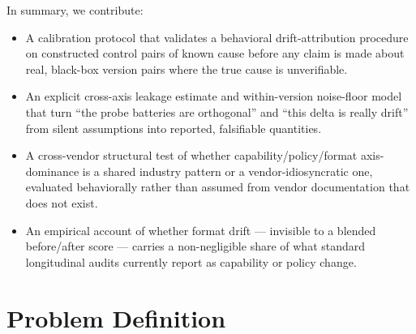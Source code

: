 \documentclass[11pt]{article}
\begin{document}
In summary, we contribute:
\begin{itemize}[leftmargin=1.4em]
\item A calibration protocol that validates a behavioral drift-attribution procedure on constructed control pairs of known cause before any claim is made about real, black-box version pairs where the true cause is unverifiable.
\item An explicit cross-axis leakage estimate and within-version noise-floor model that turn ``the probe batteries are orthogonal'' and ``this delta is really drift'' from silent assumptions into reported, falsifiable quantities.
\item A cross-vendor structural test of whether capability/policy/format axis-dominance is a shared industry pattern or a vendor-idiosyncratic one, evaluated behaviorally rather than assumed from vendor documentation that does not exist.
\item An empirical account of whether format drift --- invisible to a blended before/after score --- carries a non-negligible share of what standard longitudinal audits currently report as capability or policy change.
\end{itemize}

\section{Problem Definition}
\end{document}
